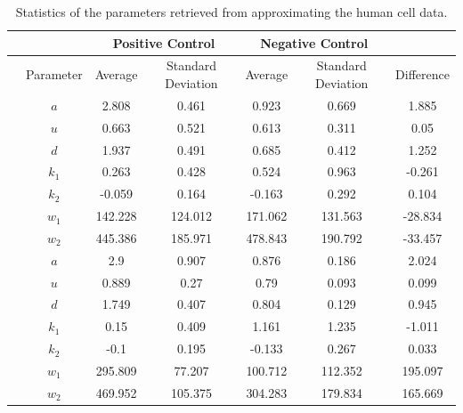 \begin{table}[h!]
	\centering
	\begin{tabular}{|c|c|c|c|c|c|c|}
		\hline
		 & & \multicolumn{2}{|c|}{Positive Control} & \multicolumn{2}{|c|}{Negative Control} & \\ 
		\hline
		& Parameter & Average & Standard Deviation & Average & Standard Deviation & Difference \\ 
		\hline
		\multirow{7}{*}{\rotatebox[origin=c]{90}{human cells}} & $a$ & 2.808 & 0.461 & 0.923 & 0.669 & 1.885\\
		\cline{2-7}
		& $u$ & 0.663 & 0.521 & 0.613 & 0.311 & 0.05\\
		\cline{2-7}
		& $d$ & 1.937 & 0.491 & 0.685 & 0.412 & 1.252\\
		\cline{2-7}
		& $k_1$ & 0.263 & 0.428 & 0.524 & 0.963 & -0.261 \\
		\cline{2-7}
		& $k_2$ & -0.059 & 0.164 & -0.163 & 0.292 & 0.104 \\
		\cline{2-7}
		& $w_1$ & 142.228 & 124.012 & 171.062 & 131.563 & -28.834 \\
		\cline{2-7}
		& $w_2$ & 445.386 & 185.971 & 478.843 & 190.792 & -33.457 \\
		\hline
		\multirow{7}{*}{\rotatebox[origin=c]{90}{mouse cells}} & $a$ & 2.9 & 0.907 & 0.876 & 0.186 & 2.024 \\
		\cline{2-7}
		& $u$ & 0.889 & 0.27 & 0.79 & 0.093 & 0.099 \\
		\cline{2-7}
		& $d$ & 1.749 & 0.407 & 0.804 & 0.129 & 0.945 \\
		\cline{2-7}
		& $k_1$ & 0.15 & 0.409 & 1.161 & 1.235 & -1.011 \\
		\cline{2-7}
		& $k_2$ & -0.1 & 0.195 & -0.133 & 0.267 & 0.033 \\
		\cline{2-7}
		& $w_1$ & 295.809 & 77.207 & 100.712 & 112.352 & 195.097 \\
		\cline{2-7}
		& $w_2$ & 469.952 & 105.375 & 304.283 & 179.834 & 165.669 \\
		\hline
	\end{tabular}
	\label{tab:statistics_parameters}
	\caption{Statistics of the parameters retrieved from approximating the human cell data.}
\end{table}

